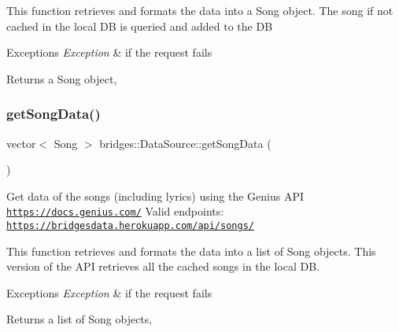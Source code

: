 This function retrieves and formats the data into a Song object. The song if not cached in the local DB is queried and added to the DB


\begin{DoxyExceptions}{Exceptions}
{\em Exception} & if the request fails\\
\hline
\end{DoxyExceptions}
\begin{DoxyReturn}{Returns}
a Song object, 
\end{DoxyReturn}
\mbox{\label{namespacebridges_1_1_data_source_a325b6f25041e833bc2fd561bd2c2ee6e}} 
\subsubsection{\texorpdfstring{get\+Song\+Data()}{getSongData()}}
{\footnotesize\ttfamily vector$<$ Song $>$ bridges\+::\+Data\+Source\+::get\+Song\+Data (\begin{DoxyParamCaption}{ }\end{DoxyParamCaption})}

Get data of the songs (including lyrics) using the Genius A\+PI \href{https://docs.genius.com/}{\tt https\+://docs.\+genius.\+com/} Valid endpoints\+: \href{https://bridgesdata.herokuapp.com/api/songs/}{\tt https\+://bridgesdata.\+herokuapp.\+com/api/songs/}

This function retrieves and formats the data into a list of Song objects. This version of the A\+PI retrieves all the cached songs in the local DB.


\begin{DoxyExceptions}{Exceptions}
{\em Exception} & if the request fails\\
\hline
\end{DoxyExceptions}
\begin{DoxyReturn}{Returns}
a list of Song objects, 
\end{DoxyReturn}
